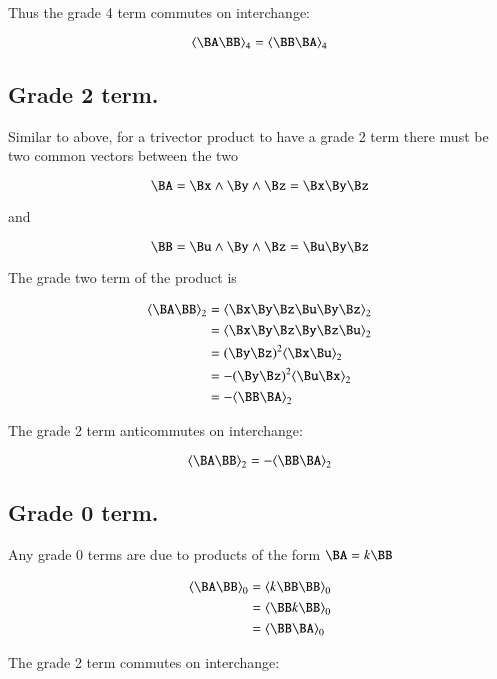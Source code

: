 \documentclass{article}      %
\newcommand{\gpgrade}[2] {{\left\langle{{#1}}\right\rangle}_{#2}}
\begin{document}
Thus the grade 4 term commutes on interchange:

\begin{equation}\label{eqn:trivecgpgrade4}
\gpgrade{\BA\BB}{4} = \gpgrade{\BB\BA}{4}
\end{equation}

\subsection{ Grade 2 term. }

Similar to above, 
for a trivector product to have a grade 2 term there must be two common
vectors between the two

\[
\BA = \Bx \wedge \By \wedge \Bz = \Bx\By\Bz
\]

and

\[
\BB = \Bu \wedge \By \wedge \Bz =\Bu\By\Bz
\]

The grade two term of the product is

\begin{align*}
\gpgrade{\BA \BB}{2}
&= \gpgrade{ \Bx\By\Bz \Bu\By\Bz }{2} \\
&= \gpgrade{ \Bx\By\Bz \By\Bz \Bu}{2} \\
&= (\By\Bz)^2\gpgrade{ \Bx \Bu}{2} \\
&= -(\By\Bz)^2\gpgrade{ \Bu \Bx}{2} \\
&= -\gpgrade{ \BB \BA }{2} \\
\end{align*}

The grade 2 term anticommutes on interchange:

\begin{equation}\label{eqn:trivecgpgrade2}
\gpgrade{\BA\BB}{2} = -\gpgrade{\BB\BA}{2}
\end{equation}

\subsection{ Grade 0 term. }

Any grade 0 terms are due to products of the form $\BA = k\BB$

\begin{align*}
\gpgrade{\BA \BB}{0}
&= \gpgrade{k\BB \BB}{0} \\
&= \gpgrade{\BB k\BB}{0} \\
&= \gpgrade{\BB \BA}{0} \\
\end{align*}

The grade 2 term commutes on interchange:
\end{document}
